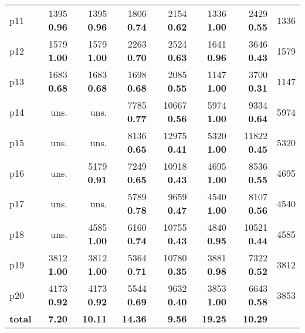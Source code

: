 \begin{tabular}{|l|rrrrrr|r|}
p11 & {\footnotesize 1395} \textbf{0.96} & {\footnotesize 1395} \textbf{0.96} & {\footnotesize 1806} \textbf{0.74} & {\footnotesize 2154} \textbf{0.62} & {\footnotesize 1336} \textbf{1.00} & {\footnotesize 2429} \textbf{0.55} & 1336\\
p12 & {\footnotesize 1579} \textbf{1.00} & {\footnotesize 1579} \textbf{1.00} & {\footnotesize 2263} \textbf{0.70} & {\footnotesize 2524} \textbf{0.63} & {\footnotesize 1641} \textbf{0.96} & {\footnotesize 3646} \textbf{0.43} & 1579\\
p13 & {\footnotesize 1683} \textbf{0.68} & {\footnotesize 1683} \textbf{0.68} & {\footnotesize 1698} \textbf{0.68} & {\footnotesize 2085} \textbf{0.55} & {\footnotesize 1147} \textbf{1.00} & {\footnotesize 3700} \textbf{0.31} & 1147\\
p14 & uns. & uns. & {\footnotesize 7785} \textbf{0.77} & {\footnotesize 10667} \textbf{0.56} & {\footnotesize 5974} \textbf{1.00} & {\footnotesize 9334} \textbf{0.64} & 5974\\
p15 & uns. & uns. & {\footnotesize 8136} \textbf{0.65} & {\footnotesize 12975} \textbf{0.41} & {\footnotesize 5320} \textbf{1.00} & {\footnotesize 11822} \textbf{0.45} & 5320\\
p16 & uns. & {\footnotesize 5179} \textbf{0.91} & {\footnotesize 7249} \textbf{0.65} & {\footnotesize 10918} \textbf{0.43} & {\footnotesize 4695} \textbf{1.00} & {\footnotesize 8536} \textbf{0.55} & 4695\\
p17 & uns. & uns. & {\footnotesize 5789} \textbf{0.78} & {\footnotesize 9659} \textbf{0.47} & {\footnotesize 4540} \textbf{1.00} & {\footnotesize 8107} \textbf{0.56} & 4540\\
p18 & uns. & {\footnotesize 4585} \textbf{1.00} & {\footnotesize 6160} \textbf{0.74} & {\footnotesize 10755} \textbf{0.43} & {\footnotesize 4840} \textbf{0.95} & {\footnotesize 10521} \textbf{0.44} & 4585\\
p19 & {\footnotesize 3812} \textbf{1.00} & {\footnotesize 3812} \textbf{1.00} & {\footnotesize 5364} \textbf{0.71} & {\footnotesize 10780} \textbf{0.35} & {\footnotesize 3881} \textbf{0.98} & {\footnotesize 7322} \textbf{0.52} & 3812\\
p20 & {\footnotesize 4173} \textbf{0.92} & {\footnotesize 4173} \textbf{0.92} & {\footnotesize 5544} \textbf{0.69} & {\footnotesize 9632} \textbf{0.40} & {\footnotesize 3853} \textbf{1.00} & {\footnotesize 6643} \textbf{0.58} & 3853\\
\hline
\textbf{total} & \textbf{7.20} & \textbf{10.11} & \textbf{14.36} & \textbf{9.56} & \textbf{19.25} & \textbf{10.29} & \\
\hline
\end{tabular}

